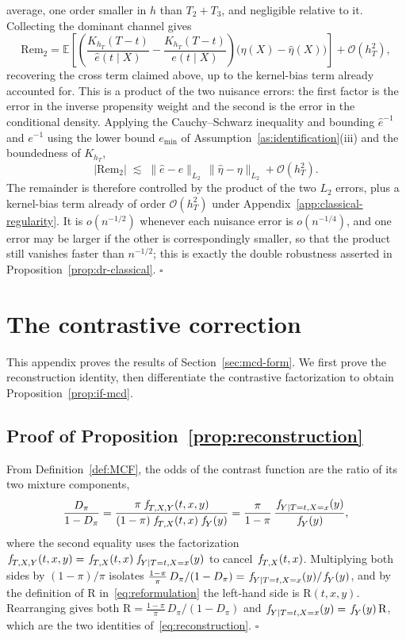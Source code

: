 \documentclass[11pt]{article}
\theoremstyle{plain}
\theoremstyle{definition}
\theoremstyle{remark}
\newcommand{\pE}{\ensuremath{\mathbb{E}}}
\newcommand{\pf}[1]{\ensuremath{\,\mathlarger{\textit{f}}_{#1}}}
\newcommand{\ratio}{\ensuremath{\pi}}
\newcommand{\contrast}{D_{\ratio}}
\newcommand{\DensityRatio}{\text{R}}
\newcommand{\cO}{\mathcal{O}}
\newcommand{\gps}{e}
\newcommand{\Rem}{\mathrm{Rem}}
\begin{document}
average, one order smaller in $h$ than $T_2+T_3$, and negligible relative to it. Collecting the
dominant channel gives
\begin{equation}
\Rem_2
= \pE\!\left[
\left( \frac{K_{h_T}(T-t)}{\widehat\gps(t \mid X)}
- \frac{K_{h_T}(T-t)}{\gps(t \mid X)} \right)
\Big( \eta(X) - \widehat\eta(X) \Big)
\right] + \cO(h_T^2),
\label{eq:app-remainder}
\end{equation}
recovering the cross term claimed above, up to the kernel-bias term already accounted for. This
is a product of the two nuisance errors: the first factor is the error in the inverse propensity
weight and the second is the error in the conditional density. Applying the Cauchy--Schwarz
inequality and bounding $\widehat\gps^{-1}$ and $\gps^{-1}$ using the lower bound $\gps_{\min}$
of Assumption~\ref{as:identification}(iii) and the boundedness of $K_{h_T}$,
\[
|\Rem_2| \;\lesssim\; \big\| \widehat\gps - \gps \big\|_{L_2}\,
\big\| \widehat\eta - \eta \big\|_{L_2} + \cO(h_T^2) .
\]
The remainder is therefore controlled by the product of the two $L_2$ errors, plus a
kernel-bias term already of order $\cO(h_T^2)$ under Appendix~\ref{app:classical-regularity}. It
is $o(n^{-1/2})$ whenever each nuisance error is $o(n^{-1/4})$, and one error may be larger if
the other is correspondingly smaller, so that the product still vanishes faster than
$n^{-1/2}$; this is exactly the double robustness asserted in
Proposition~\ref{prop:dr-classical}. \hfill$\square$

\section{The contrastive correction}
\label{app:mcd}

This appendix proves the results of Section~\ref{sec:mcd-form}. We first prove the
reconstruction identity, then differentiate the contrastive factorization to obtain
Proposition~\ref{prop:if-mcd}.

\subsection{Proof of Proposition~\ref{prop:reconstruction}}
\label{app:mcd-reconstruction}

From Definition~\ref{def:MCF}, the odds of the contrast function are the ratio of its two
mixture components,
\[
\frac{\contrast}{1-\contrast}
= \frac{\ratio\,\pf{T,X,Y}(t,x,y)}{(1-\ratio)\,\pf{T,X}(t,x)\,\pf{Y}(y)}
= \frac{\ratio}{1-\ratio}\,\frac{\pf{Y \mid T=t,X=x}(y)}{\pf{Y}(y)} ,
\]
where the second equality uses the factorization
$\pf{T,X,Y}(t,x,y) = \pf{T,X}(t,x)\,\pf{Y \mid T=t,X=x}(y)$ to cancel $\pf{T,X}(t,x)$.
Multiplying both sides by $(1-\ratio)/\ratio$ isolates
$\frac{1-\ratio}{\ratio}\,\contrast/(1-\contrast) = \pf{Y \mid T=t,X=x}(y)/\pf{Y}(y)$, and by
the definition of $\DensityRatio$ in~\eqref{eq:reformulation} the left-hand side is
$\DensityRatio(t,x,y)$. Rearranging gives both
$\DensityRatio = \frac{1-\ratio}{\ratio}\,\contrast/(1-\contrast)$ and
$\pf{Y \mid T=t,X=x}(y) = \pf{Y}(y)\,\DensityRatio$, which are the two identities
of~\eqref{eq:reconstruction}. \hfill$\square$
\end{document}
